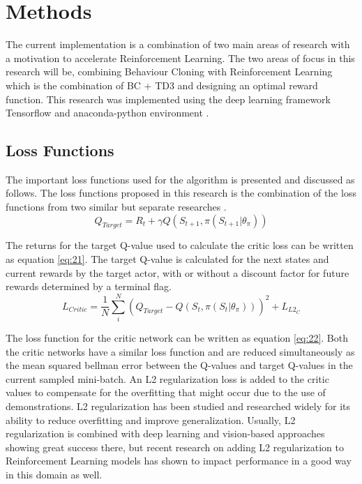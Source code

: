 \section{Methods} \label{section:methods}

The current implementation is a combination of two main areas of research with a motivation to accelerate Reinforcement Learning. The two areas of focus in this research will be, combining Behaviour Cloning with Reinforcement Learning which is the combination of BC + TD3 and designing an optimal reward function. This research was implemented using the deep learning framework Tensorflow \cite{tensorflow2015-whitepaper} and anaconda-python environment \cite{anaconda}. \\

\subsection{Loss Functions}

The important loss functions used for the algorithm is presented and discussed as follows. The loss functions proposed in this research is the combination of the loss functions from two similar but separate researches \cite{goecks2020integrating} \cite{nair2018overcoming}. \\

\begin{equation}\label{eq:21}
    Q_{Target} = R_t + \gamma Q(S_{t+1}, \pi(S_{t+1} | \theta_\pi ))
\end{equation}

The returns for the target Q-value used to calculate the critic loss can be written as equation \ref{eq:21}. The target Q-value is calculated for the next states and current rewards by the target actor, with or without a discount factor for future rewards determined by a terminal flag. \\

\begin{equation}\label{eq:22}
    L_{Critic} = \frac{1}{N} \sum_{i}^{N} (Q_{Target} - Q(S_{t}, \pi(S_{t} | \theta_\pi )) )^2 + L_{L2_{C}}
\end{equation}

The loss function for the critic network can be written as equation \ref{eq:22}. Both the critic networks have a similar loss function and are reduced simultaneously as the mean squared bellman error between the Q-values and target Q-values in the current sampled mini-batch. An L2 regularization loss is added to the critic values to compensate for the overfitting that might occur due to the use of demonstrations. L2 regularization \cite{cortes2012l2} has been studied and researched widely for its ability to reduce overfitting and improve generalization. Usually, L2 regularization is combined with deep learning and vision-based approaches showing great success there, but recent research on adding L2 regularization \cite{goecks2020integrating} \cite{liu2021regularization} to Reinforcement Learning models has shown to impact performance in a good way in this domain as well. \\

